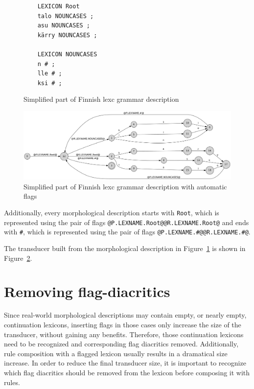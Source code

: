 \documentclass[final]{beamer}
\begin{document}
\begin{poster}
\begin{figure}
    \centering
    \begin{verbatim}
    LEXICON Root
    talo NOUNCASES ;
    asu NOUNCASES ;
    kärry NOUNCASES ;

    LEXICON NOUNCASES
    n # ;
    lle # ;
    ksi # ;
    \end{verbatim}
    \caption{Simplified part of Finnish lexc grammar description
    \label{fig:lexc-fin}}
\end{figure}

\begin{figure}
    \includegraphics[width=\textwidth]{transducer.png}
     \caption{Simplified part of Finnish lexc grammar description with automatic flags
     \label{fig:lexc-fin-flag}}
\end{figure}

Additionally,
every morphological description starts with \texttt{Root}, which is
represented using the pair of flags
\verb+@P.LEXNAME.Root@@R.LEXNAME.Root@+ and ends with \texttt{\#}, which is represented using the pair of flags \verb+@P.LEXNAME.#@@R.LEXNAME.#@+.

The transducer built from the morphological description in
Figure~\ref{fig:lexc-fin} is shown in Figure~\ref{fig:lexc-fin-flag}.




\newcolumn

\section{Removing flag-diacritics }
\justifying
Since real-world morphological descriptions may contain empty, or nearly
empty, continuation lexicons, inserting flags in those cases only
increase the size of the transducer, without gaining any
benefits. Therefore, those continuation lexicons need to be recognized and corresponding flag diacritics removed.
Additionally, rule composition with a flagged lexicon usually results in a dramatical size
increase. In order to reduce the final transducer size, it is important to recognize which flag diacritics should be removed from the lexicon 
before composing it with rules.  


\end{poster}
\end{document}
